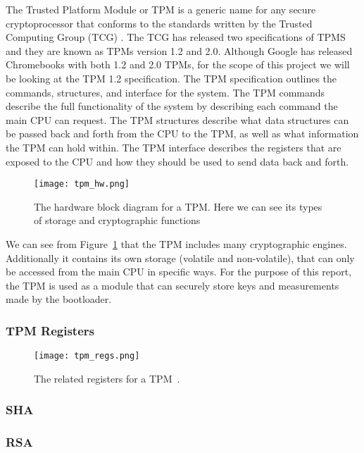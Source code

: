 \documentclass[../report.tex]{subfiles}
\begin{document}
The Trusted Platform Module\cite{TPM} or TPM is a generic name for any secure cryptoprocessor that conforms to the standards written by the Trusted Computing Group (TCG) \cite{TCG}.
The TCG has released two specifications of TPMS and they are known as TPMs version 1.2 and 2.0.
Although Google has released Chromebooks with both 1.2 and 2.0 TPMs, for the scope of this project we will be looking at the TPM 1.2 specification.
The TPM specification outlines the commands, structures, and interface for the system.
The TPM commands describe the full functionality of the system by describing each command the main CPU can request.
The TPM structures describe what data structures can be passed back and forth from the CPU to the TPM, as well as what information the TPM can hold within.
The TPM interface describes the registers that are exposed to the CPU and how they should be used to send data back and forth.

\begin{figure}
  \centering
  \texttt{[image: tpm\_hw.png]}
  \caption{The hardware block diagram for a TPM. Here we can see its types of storage and cryptographic functions\cite{tpm-slides}}
  \label{fig:tpm_hw}
\end{figure}

We can see from Figure~\ref{fig:tpm_hw} that the TPM includes many cryptographic engines. 
Additionally it contains its own storage (volatile and non-volatile), that can only be accessed from the main CPU in specific ways.
For the purpose of this report, the TPM is used as a module that can securely store keys and measurements made by the bootloader.

\subsubsection{TPM Registers}

\begin{figure}
  \centering
  \texttt{[image: tpm\_regs.png]}
  \caption{The related registers for a TPM~.}
  \label{fig:fmap}
\end{figure}


\subsubsection{SHA}
\subsubsection{RSA}
\end{document}
